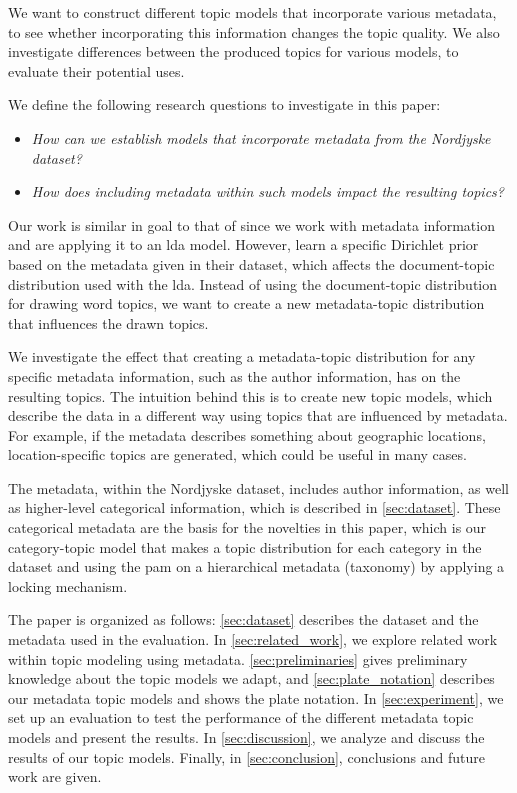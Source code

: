 We want to construct different topic models that incorporate various metadata, to see whether incorporating this information changes the topic quality.
We also investigate differences between the produced topics for various models, to evaluate their potential uses.

We define the following research questions to investigate in this paper:

\begin{itemize}
	\item \textit{How can we establish models that incorporate metadata from the Nordjyske dataset?}
	\item \textit{How does including metadata within such models impact the resulting topics?}
\end{itemize}

Our work is similar in goal to that of \citet{MetaLDA2017} since we work with metadata information and are applying it to an \gls{lda} model.
However, \citet{MetaLDA2017} learn a specific Dirichlet prior based on the metadata given in their dataset, which affects the document-topic distribution used with the \gls{lda}.
Instead of using the document-topic distribution for drawing word topics, we want to create a new metadata-topic distribution that influences the drawn topics.

We investigate the effect that creating a metadata-topic distribution for any specific metadata information, such as the author information, has on the resulting topics.
The intuition behind this is to create new topic models, which describe the data in a different way using topics that are influenced by metadata.
For example, if the metadata describes something about geographic locations, location-specific topics are generated, which could be useful in many cases.

The metadata, within the Nordjyske dataset, includes author information, as well as higher-level categorical information, which is described in \autoref{sec:dataset}.
These categorical metadata are the basis for the novelties in this paper, which is our category-topic model that makes a topic distribution for each category in the dataset and using the \gls{pam} on a hierarchical metadata (taxonomy) by applying a locking mechanism.

The paper is organized as follows:
\autoref{sec:dataset} describes the dataset and the metadata used in the evaluation.
In \autoref{sec:related_work}, we explore related work within topic modeling using metadata.
\autoref{sec:preliminaries} gives preliminary knowledge about the topic models we adapt, and \autoref{sec:plate_notation} describes our metadata topic models and shows the plate notation.
In \autoref{sec:experiment}, we set up an evaluation to test the performance of the different metadata topic models and present the results.
In \autoref{sec:discussion}, we analyze and discuss the results of our topic models.
Finally, in \autoref{sec:conclusion}, conclusions and future work are given.
